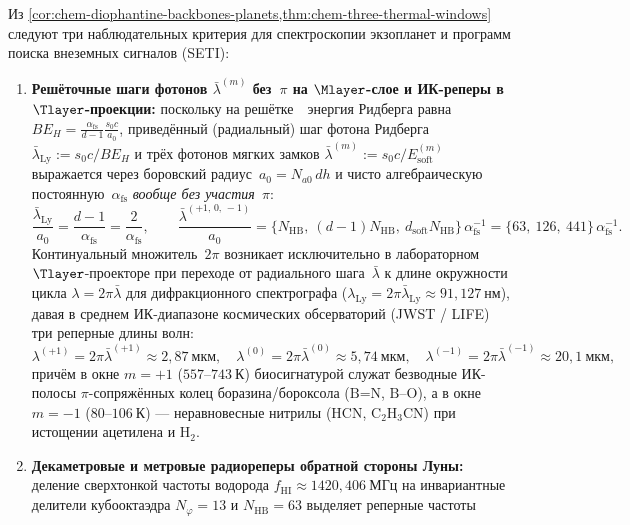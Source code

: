 \begin{corollary}
\label{cor:chem-biosignatures-seti}
Из \cref{cor:chem-diophantine-backbones-planets,thm:chem-three-thermal-windows} следуют три наблюдательных критерия для спектроскопии экзопланет и программ поиска внеземных сигналов (SETI):
\begin{enumerate}[leftmargin=*,noitemsep]
\item \textbf{Решёточные шаги фотонов $\bar\lambda^{(m)}$ без~$\pi$ на $\Mlayer$-слое и ИК-реперы в $\Tlayer$-проекции:}
  поскольку на решётке~\latGCKshort\ энергия Ридберга равна $BE_H = \frac{\alpha_{\mathrm{fs}}}{d-1}\frac{s_0 c}{a_0}$, приведённый (радиальный) шаг фотона Ридберга $\bar\lambda_{\mathrm{Ly}} := s_0 c/BE_H$ и трёх фотонов мягких замков $\bar\lambda^{(m)} := s_0 c/E_{\mathrm{soft}}^{(m)}$ выражается через боровский радиус~$a_0 = N_{a0}\,dh$ и чисто алгебраическую постоянную~$\alpha_{\mathrm{fs}}$ \emph{вообще без участия~$\pi$}:
  \[
    \frac{\bar\lambda_{\mathrm{Ly}}}{a_0} = \frac{d-1}{\alpha_{\mathrm{fs}}} = \frac{2}{\alpha_{\mathrm{fs}}},\qquad
    \frac{\bar\lambda^{(+1,\,0,\,-1)}}{a_0}
    = \bigl\{N_{\mathrm{HB}},\ (d-1)N_{\mathrm{HB}},\ d_{\mathrm{soft}}N_{\mathrm{HB}}\bigr\}\,\alpha_{\mathrm{fs}}^{-1}
    = \bigl\{63,\ 126,\ 441\bigr\}\,\alpha_{\mathrm{fs}}^{-1}.
  \]
  Континуальный множитель~$2\pi$ возникает исключительно в лабораторном $\Tlayer$-проекторе при переходе от радиального шага~$\bar\lambda$ к длине окружности цикла $\lambda = 2\pi\bar\lambda$ для дифракционного спектрографа ($\lambda_{\mathrm{Ly}} = 2\pi\bar\lambda_{\mathrm{Ly}} \approx 91{,}127\ \mathrm{нм}$), давая в среднем ИК-диапазоне космических обсерваторий (JWST / LIFE) три реперные длины волн:
  \[
    \lambda^{(+1)} = 2\pi\bar\lambda^{(+1)} \approx 2{,}87\ \text{мкм},\quad
    \lambda^{(0)} = 2\pi\bar\lambda^{(0)} \approx 5{,}74\ \text{мкм},\quad
    \lambda^{(-1)} = 2\pi\bar\lambda^{(-1)} \approx 20{,}1\ \text{мкм},
  \]
  причём в окне $m=+1$ ($557\text{--}743\ \mathrm{К}$) биосигнатурой служат безводные ИК-полосы $\pi$-сопряжённых колец боразина/бороксола ($\text{B=N}$, $\text{B--O}$), а в окне $m=-1$ ($80\text{--}106\ \mathrm{К}$) --- неравновесные нитрилы ($\text{HCN}$, $\text{C}_2\text{H}_3\text{CN}$) при истощении ацетилена и $\text{H}_2$.
\item \textbf{Декаметровые и метровые радиореперы обратной стороны Луны:}
  деление сверхтонкой частоты водорода $f_{\mathrm{HI}} \approx 1420{,}406\ \mathrm{МГц}$ на инвариантные делители кубооктаэдра $N_\varphi = 13$ и $N_{\mathrm{HB}} = 63$ выделяет реперные частоты

\end{enumerate}
\end{corollary}
